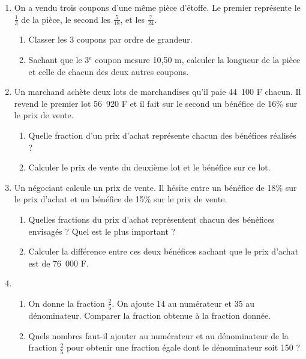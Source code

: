 \begin{enumerate}
\item On a vendu trois coupons d'une même pièce d'étoffe. Le premier représente le $\frac13$ de la pièce, le second les $\frac5{18}$, et les $\frac{7}{24}$. \begin{enumerate}
\item Classer les 3 coupons par ordre de grandeur. 
\item Sachant que le 3${}^e$ coupon mesure 10,50 m, 
calculer la longueur de la pièce et celle de chacun des deux autres coupons. 
\end{enumerate}
\item Un marchand achète deux lots de marchandises qu'il paie 44~100 F chacun. Il revend le premier lot 56~920 F et il fait sur le second un bénéfice de 16\% sur le prix de vente. \begin{enumerate}
\item Quelle fraction d'un prix d'achat représente chacun des bénéfices réalisés ? 
\item Calculer le prix de vente du deuxième lot et 
le bénéfice sur ce lot. 
\end{enumerate} 
\item Un négociant calcule un prix de vente. Il hésite entre un bénéfice de 18\% sur le prix d'achat et un bénéfice de 15\% sur le prix de vente. \begin{enumerate}
\item Quelles fractions du prix d'achat représentent chacun des bénéfices envisagés ? Quel est le plus important ? 
\item Calculer la différence entre ces deux bénéfices 
sachant que le prix d'achat est de 76~000 F. 
\end{enumerate}
\item \begin{enumerate}
\item On donne la fraction $\frac25$. On ajoute 14 au numérateur et 35 au dénominateur. Comparer la fraction obtenue à la fraction donnée. 
\item Quels nombres faut-il ajouter au numérateur et au dénominateur de la fraction $\frac25$ pour obtenir une fraction égale dont le dénominateur soit 150 ?
\end{enumerate}
\end{enumerate}